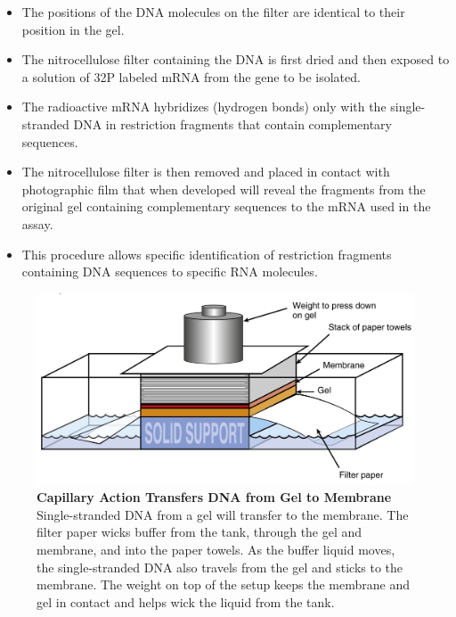 \documentclass[11pt,dvipsnames,ignorenonframetext,aspectratio=169]{beamer}
\providecommand{\tightlist}{%
  \setlength{\itemsep}{0pt}\setlength{\parskip}{0pt}}
\begin{document}
\begin{frame}{}
\protect\hypertarget{section-28}{}

\begin{itemize}
\tightlist
\item
  The positions of the DNA molecules on the filter are identical to
  their position in the gel.
\item
  The nitrocellulose filter containing the DNA is first dried and then
  exposed to a solution of 32P labeled mRNA from the gene to be
  isolated.
\item
  The radioactive mRNA hybridizes (hydrogen bonds) only with the
  single-stranded DNA in restriction fragments that contain
  complementary sequences.
\item
  The nitrocellulose filter is then removed and placed in contact with
  photographic film that when developed will reveal the fragments from
  the original gel containing complementary sequences to the mRNA used
  in the assay.
\item
  This procedure allows specific identification of restriction fragments
  containing DNA sequences to specific RNA molecules.
\end{itemize}

\end{frame}

\begin{frame}{}
\protect\hypertarget{section-29}{}

\begin{figure}
\includegraphics[width=0.35\linewidth]{./../images/southern_blotting} \caption{\textbf{Capillary Action Transfers DNA from Gel to Membrane} \newline Single-stranded DNA from a gel will transfer to the membrane. The filter paper wicks buffer from the tank, through the gel and membrane, and into the paper towels. As the buffer liquid moves, the single-stranded DNA also travels from the gel and sticks to the membrane. The weight on top of the setup keeps the membrane and gel in contact and helps wick the liquid from the tank.}\label{fig:southern-blotting}
\end{figure}

\end{frame}
\end{document}
